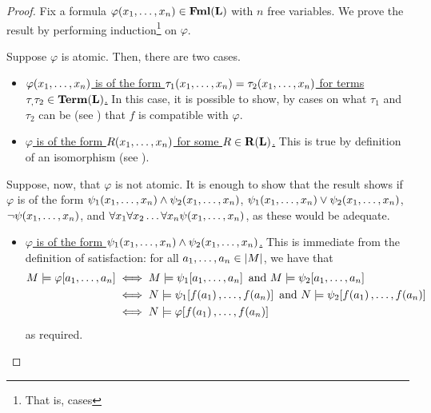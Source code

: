 \begin{proof}
    Fix a formula $\varphi\!\left( x_1, \ldots, x_n \right) \in \mathbf{Fml}\!\left( \mathbf{L} \right)$ with $n$ free variables. We prove the result by performing induction\footnote{That is, cases} on $\varphi$.
    
    Suppose $\varphi$ is atomic. Then, there are two cases.
    \begin{itemize}
        \item \underline{$\varphi\!\left( x_1, \ldots, x_n \right)$ is of the form $\tau_1\!\left( x_1, \ldots, x_n \right) = \tau_2\!\left( x_1, \ldots, x_n \right)$ for terms $\tau_, \tau_2 \in \mathbf{Term}\!\left( \mathbf{L} \right)$.}
        In this case, it is possible to show, by cases on what $\tau_1$ and $\tau_2$ can be (see ) that $f$ is compatible with $\varphi$.

        \item \underline{$\varphi$ is of the form $R\!\left( x_1, \ldots, x_n \right)$ for some $R \in \mathbf{R}\!\left( \mathbf{L} \right)$.}
        This is true by definition of an isomorphism (see ).
    \end{itemize}

    Suppose, now, that $\varphi$ is not atomic. It is enough to show that the result shows if $\varphi$ is of the form $\psi_1\!\left( x_1, \ldots, x_n \right) \land \psi_2\!\left( x_1, \ldots, x_n \right)$, $\psi_1\!\left( x_1, \ldots, x_n \right) \lor \psi_2\!\left( x_1, \ldots, x_n \right)$, $\neg \psi\!\left( x_1, \ldots, x_n \right)$, and $\forall x_1 \forall x_2 \ldots \forall x_{n} \psi\!\left( x_1, \ldots, x_n \right)$, as these would be adequate.

    \begin{itemize}
        \item \underline{$\varphi$ is of the form $\psi_1\!\left( x_1, \ldots, x_n \right) \land \psi_2\!\left( x_1, \ldots, x_n \right)$.}
        This is immediate from the definition of satisfaction: for all $a_1, \ldots, a_n \in \left\lvert M \right\rvert$, we have that
        \begin{align*}
            M \models \varphi\!\brac{a_1, \ldots, a_n}
            & \iff
            M \models \psi_1\!\brac{a_1, \ldots, a_n}
            \text{ and }
            M \models \psi_2\!\brac{a_1, \ldots, a_n} \\
            & \iff
            N \models \psi_1\!\brac{f\of{a_1}, \ldots, f\of{a_n}}
            \text{ and }
            N \models \psi_2\!\brac{f\of{a_1}, \ldots, f\of{a_n}} \\
            &\iff
            N \models \varphi\!\brac{f\of{a_1}, \ldots, f\of{a_n}}
        \end{align*}
        as required.


\end{itemize}
\end{proof}
